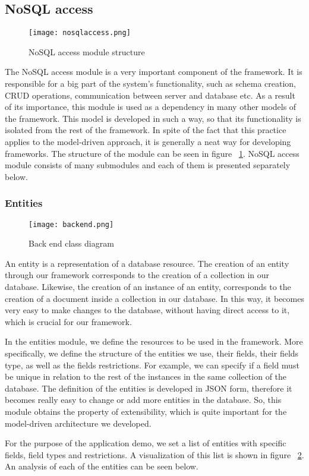 \subsection{NoSQL access}
\label{nosql}
\begin{figure}
	\centerline{\texttt{[image: nosqlaccess.png]}}
	\caption{NoSQL access module structure}
	\label{nosqlaccess}
\end{figure}
The NoSQL access module is a very important component of the framework. It is responsible for a big part of the system's functionality, such as schema creation, CRUD operations, communication between server and database etc. As a result of its importance, this module is used as a dependency in many other models of the framework. This model is developed in such a way, so that its functionality is isolated from the rest of the framework. In spite of the fact that this practice applies to the model-driven approach, it is generally a neat way for developing frameworks. The structure of the module can be seen in figure ~\ref{nosqlaccess}. NoSQL access module consists of many submodules and each of them is presented separately below. 

\subsubsection{Entities}
\label{entities}
\begin{figure}
	\centerline{\texttt{[image: backend.png]}}
	\caption{Back end class diagram}
	\label{backend}
\end{figure}
An entity is a representation of a database resource. The creation of an entity through our framework corresponds to the creation of a collection in our database. Likewise, the creation of an instance of an entity, corresponds to the creation of a document inside a collection in our database. In this way, it becomes very easy to make changes to the database, without having direct access to it, which is crucial for our framework.\par
	In the entities module, we define the resources to be used in the framework. More specifically, we define the structure of the entities we use, their fields, their fields type, as well as the fields restrictions. For example, we can specify if a field must be unique in relation to the rest of the instances in the same collection of the database. The definition of the entities is developed in JSON form, therefore it becomes really easy to change or add more entities in the database. So, this module obtains the property of extensibility, which is quite important for the model-driven architecture we developed. \par 
	For the purpose of the application demo, we set a list of entities with specific fields, field types and restrictions. A visualization of this list is shown in figure ~\ref{backend}. An analysis of each of the entities can be seen below.\par
	
